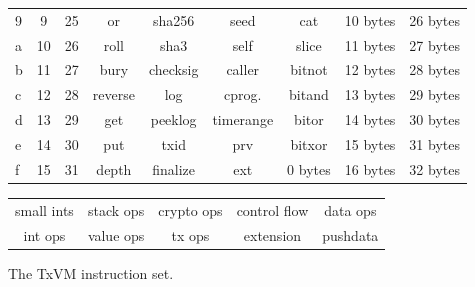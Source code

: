 \documentclass{article}
\begin{document}
\begin{figure}
\begin{tabularx}{\textwidth}{lCCCCCCCC}
9 &  9         &  25 &  or        &  sha256   &  seed          &  cat     &  10 bytes &  26 bytes \\
a &  10        &  26 &  roll    &  sha3     &  self          &  slice   &  11 bytes &  27 bytes \\
b &  11        &  27 &  bury    &  checksig &  caller        &  bitnot  &  12 bytes &  28 bytes \\
c &  12        &  28 &  reverse &  log          &  cprog. &  bitand  &  13 bytes &  29 bytes \\
d &  13        &  29 &  get     &  peeklog      &  timerange     &  bitor   &  14 bytes &  30 bytes \\
e &  14        &  30 &  put     &  txid         &  prv            &  bitxor  &  15 bytes &  31 bytes \\
f &  15        &  31 &  depth   &  finalize     &  ext            &  0 bytes &  16 bytes &  32 bytes \\
\end{tabularx}

\normalfont\medskip

\def\arraystretch{1.7}
\begin{tabular}{ccccc}
\cellcolor{smallint} small ints & \cellcolor{stack} stack ops & \cellcolor{crypto} crypto ops & \cellcolor{flow} control flow & \cellcolor{data} data ops \\
\cellcolor{int} int ops         & \cellcolor{value} value ops & \cellcolor{tx} tx ops         & \cellcolor{ext} extension     & \cellcolor{push} pushdata \\
\end{tabular}

\normalsize

\caption{The TxVM instruction set.}
\label{instset}
\end{figure}
\end{document}
